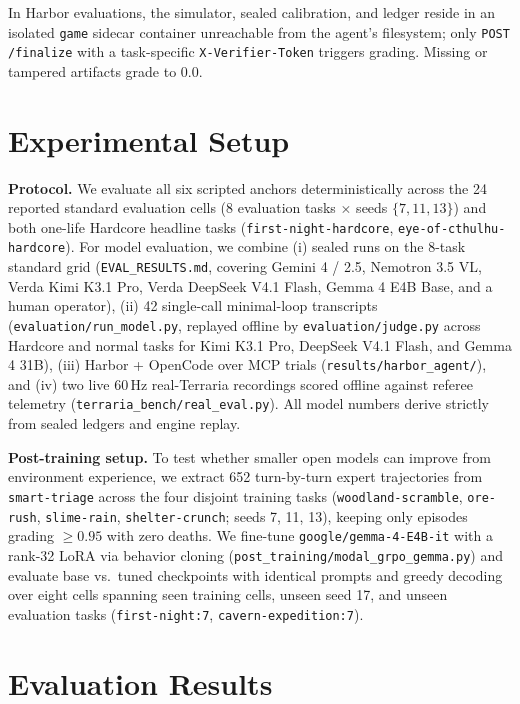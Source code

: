 \documentclass[10pt,letterpaper]{article}
\begin{document}
In Harbor evaluations, the simulator, sealed calibration, and ledger reside in an isolated \texttt{game} sidecar container unreachable from the agent's filesystem; only \texttt{POST /finalize} with a task-specific \texttt{X-Verifier-Token} triggers grading. Missing or tampered artifacts grade to $0.0$.

\section{Experimental Setup}

\textbf{Protocol.} We evaluate all six scripted anchors deterministically across the 24 reported standard evaluation cells (8 evaluation tasks $\times$ seeds $\{7, 11, 13\}$) and both one-life Hardcore headline tasks (\texttt{first-night-hardcore}, \texttt{eye-of-cthulhu-hardcore}). For model evaluation, we combine (i) sealed runs on the 8-task standard grid (\texttt{EVAL\_RESULTS.md}, covering Gemini 4 / 2.5, Nemotron 3.5 VL, Verda Kimi K3.1 Pro, Verda DeepSeek V4.1 Flash, Gemma 4 E4B Base, and a human operator), (ii) 42 single-call minimal-loop transcripts (\texttt{evaluation/run\_model.py}, replayed offline by \texttt{evaluation/judge.py} across Hardcore and normal tasks for Kimi K3.1 Pro, DeepSeek V4.1 Flash, and Gemma 4 31B), (iii) Harbor + OpenCode over MCP trials (\texttt{results/harbor\_agent/}), and (iv) two live 60\,Hz real-Terraria recordings scored offline against referee telemetry (\texttt{terraria\_bench/real\_eval.py}). All model numbers derive strictly from sealed ledgers and engine replay.

\textbf{Post-training setup.} To test whether smaller open models can improve from environment experience, we extract 652 turn-by-turn expert trajectories from \texttt{smart-triage} across the four disjoint training tasks (\texttt{woodland-scramble}, \texttt{ore-rush}, \texttt{slime-rain}, \texttt{shelter-crunch}; seeds 7, 11, 13), keeping only episodes grading $\ge 0.95$ with zero deaths. We fine-tune \texttt{google/gemma-4-E4B-it} with a rank-32 LoRA \citep{hu2022lora} via behavior cloning (\texttt{post\_training/modal\_grpo\_gemma.py}) and evaluate base vs.\ tuned checkpoints with identical prompts and greedy decoding over eight cells spanning seen training cells, unseen seed 17, and unseen evaluation tasks (\texttt{first-night:7}, \texttt{cavern-expedition:7}).

\section{Evaluation Results}
\end{document}
